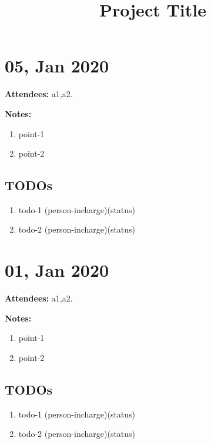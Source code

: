 \documentclass{article}
\title{Project Title}
\begin{document}
\maketitle

\section*{05, Jan 2020}

\textbf{Attendees:} a1,a2.

\textbf{Notes:}

\begin{enumerate}
    \item point-1
    \item point-2
\end{enumerate}

\subsection*{TODOs}
\begin{enumerate}
    \item todo-1 (person-incharge)(status)
    \item todo-2 (person-incharge)(status)
\end{enumerate}

\section*{01, Jan 2020}

\textbf{Attendees:} a1,a2.

\textbf{Notes:}

\begin{enumerate}
    \item point-1
    \item point-2
\end{enumerate}

\subsection*{TODOs}
\begin{enumerate}
    \item todo-1 (person-incharge)(status)
    \item todo-2 (person-incharge)(status)
\end{enumerate}
\end{document}
